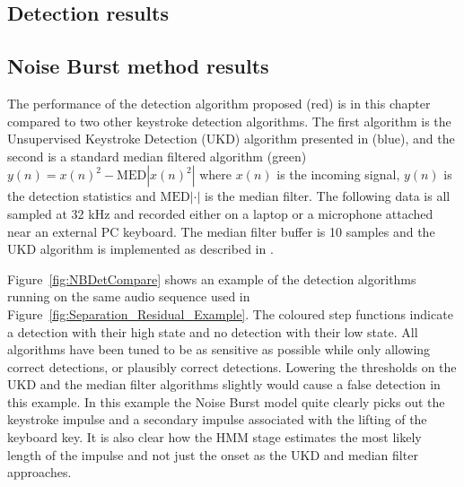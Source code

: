 \subsection{Detection results} %

\subsection{Noise Burst method results}

The performance of the detection algorithm proposed (red) is in this chapter compared to two other keystroke detection algorithms. The first algorithm is the Unsupervised Keystroke Detection (UKD) algorithm presented in \cite{Subramanya2007} (blue), and the second is a standard median filtered algorithm (green) $y(n) = x(n)^2 - \textrm{MED}\left|x(n)^2\right|$ where $x(n)$ is the incoming signal, $y(n)$ is the detection statistics and $\textrm{MED}\left|\cdot \right|$ is the median filter. The following data is all sampled at 32 kHz and recorded either on a laptop or a microphone attached near an external PC keyboard. The median filter buffer is 10 samples and the UKD algorithm is implemented as described in \cite{Subramanya2007}.

Figure~\ref{fig:NBDetCompare} shows an example of the detection algorithms running on the same audio sequence used in Figure~\ref{fig:Separation_Residual_Example}. The coloured step functions indicate a detection with their high state and no detection with their low state. All algorithms have been tuned to be as sensitive as possible while only allowing correct detections, or plausibly correct detections. Lowering the thresholds on the UKD and the median filter algorithms slightly would cause a false detection in this example. In this example the Noise Burst model quite clearly picks out the keystroke impulse and a secondary impulse associated with the lifting of the keyboard key. It is also clear how the HMM stage estimates the most likely length of the impulse and not just the onset as the UKD and median filter approaches.

